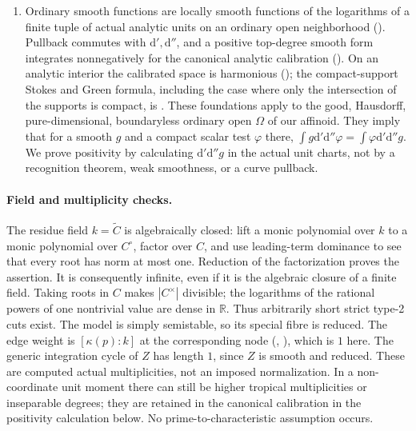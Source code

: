 \documentclass[11pt]{article}
\newcommand{\ddc}{\mathrm{d}'\mathrm{d}''}
\begin{document}
\begin{enumerate}
\item Ordinary smooth functions are locally smooth functions of the
logarithms of a finite tuple of actual analytic units on an ordinary
open neighborhood (\cite[Proposition 15.1.1(b) and Corollary 15.1.2]{CLD}).
Pullback commutes with $\mathrm{d}',\mathrm{d}''$, and a positive
top-degree smooth form integrates nonnegatively for the canonical
analytic calibration (\cite[\S7.3.1--7.3.4]{CLD}). On an analytic
interior the calibrated space is harmonious
(\cite[Theorem 15.6.1]{CLD}); the compact-support Stokes and Green
formula, including the case where only the intersection of the
supports is compact, is \cite[Proposition 5.11.1]{CLD}.
These foundations apply to the good, Hausdorff, pure-dimensional,
boundaryless ordinary open $\Omega$ of our affinoid. They imply that
for a smooth $g$ and a compact scalar test $\varphi$ there,
$\int g\ddc\varphi=\int\varphi\ddc g$.
We prove positivity by calculating $\ddc g$ in the actual unit charts,
not by a recognition theorem, weak smoothness, or a curve pullback.
\end{enumerate}

\paragraph{Field and multiplicity checks.}
The residue field $k=\widetilde C$ is algebraically closed: lift a monic
polynomial over $k$ to a monic polynomial over $C^\circ$, factor over
$C$, and use leading-term dominance to see that every root has norm
at most one. Reduction of the factorization proves the assertion.
It is consequently infinite, even if it is the algebraic closure of
a finite field. Taking roots in $C$ makes $|C^\times|$ divisible;
the logarithms of the rational powers of one nontrivial value are
dense in $\mathbb{R}$. Thus arbitrarily short strict type-2 cuts exist.
The model is simply semistable, so its special fibre is reduced.
The edge weight is $[\kappa(p):k]$ at the corresponding node
(\cite[\S2.2.3]{Thu}, \cite[15.2]{GJR}), which is $1$ here.
The generic integration cycle of $Z$ has length $1$, since $Z$ is
smooth and reduced. These are computed actual multiplicities, not
an imposed normalization. In a non-coordinate unit moment there can
still be higher tropical multiplicities or inseparable degrees;
they are retained in the canonical calibration in the positivity
calculation below. No prime-to-characteristic assumption occurs.
\end{document}
